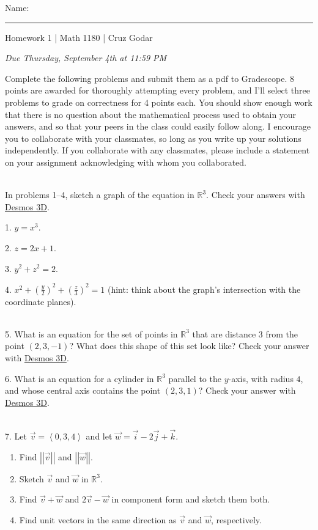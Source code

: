 \documentclass{article}
\begin{document}
\Large Name: \rule{2in}{0.15mm} \hfill Homework 1 | Math 1180 | Cruz Godar \vspace{4pt} \normalsize

\textit{Due Thursday, September 4th at 11:59 PM}

Complete the following problems and submit them as a pdf to Gradescope. 8 points are awarded for thoroughly attempting every problem, and I'll select three problems to grade on correctness for 4 points each. You should show enough work that there is no question about the mathematical process used to obtain your answers, and so that your peers in the class could easily follow along. I encourage you to collaborate with your classmates, so long as you write up your solutions independently. If you collaborate with any classmates, please include a statement on your assignment acknowledging with whom you collaborated.

~\\

In problems 1--4, sketch a graph of the equation in $\mathbb{R}^3$. Check your answers with \href{https://www.desmos.com/3d}{Desmos 3D}.

1. $\displaystyle y = x^3$.

2. $\displaystyle z = 2x + 1$.

3. $\displaystyle y^2 + z^2 = 2$.

4. $\displaystyle x^2 + \left( \frac{y}{2} \right)^2 + \left( \frac{z}{3} \right)^2 = 1$ (hint: think about the graph's intersection with the coordinate planes).

~\\

5. What is an equation for the set of points in $\mathbb{R}^3$ that are distance $3$ from the point $(2, 3, -1)$? What does this shape of this set look like? Check your answer with \href{https://www.desmos.com/3d}{Desmos 3D}.

6. What is an equation for a cylinder in $\mathbb{R}^3$ parallel to the $y$-axis, with radius $4$, and whose central axis contains the point $(2, 3, 1)$? Check your answer with \href{https://www.desmos.com/3d}{Desmos 3D}.

~\\

7. Let $\vec{v} = \left< 0, 3, 4 \right>$ and let $\vec{w} = \vec{i} - 2\vec{j} + \vec{k}$.

\begin{enumerate}

	\item Find $\left| \left| \vec{v} \right| \right|$ and $\left| \left| \vec{w} \right| \right|$.

	\item Sketch $\vec{v}$ and $\vec{w}$ in $\mathbb{R}^3$.

	\item Find $\vec{v} + \vec{w}$ and $2\vec{v} - \vec{w}$ in component form and sketch them both.

	\item Find unit vectors in the same direction as $\vec{v}$ and $\vec{w}$, respectively.

\end{enumerate}
\end{document}
